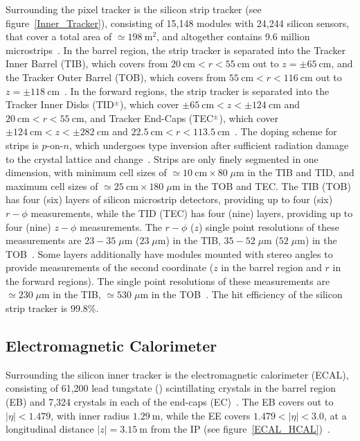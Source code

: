 Surrounding the pixel tracker is the silicon strip tracker (see figure~\ref{Inner_Tracker}), consisting of 15,148 modules with 24,244 silicon sensors, that cover a total area of $\simeq \SI{198}{\m \squared}$, and altogether contains 9.6 million microstrips~\cite{Chatrchyan:1129810}.
In the barrel region, the strip tracker is separated into the Tracker Inner Barrel (TIB), which covers from $\SI{20}{\cm} < r < \SI{55}{\cm}$ out to $z = \pm \SI{65}{\cm}$, and the Tracker Outer Barrel (TOB), which covers from $\SI{55}{\cm} < r < \SI{116}{\cm}$ out to $z = \pm \SI{118}{\cm}$~\cite{Bayatian:922757}.
In the forward regions, the strip tracker is separated into the Tracker Inner Disks (TID$^\pm$), which cover $\pm\SI{65}{\cm} < z < \pm\SI{124}{\cm}$ and $\SI{20}{\cm} < r < \SI{55}{\cm}$, and Tracker End-Caps (TEC$^\pm$), which cover $\pm\SI{124}{\cm} < z < \pm\SI{282}{\cm}$ and $\SI{22.5}{\cm} < r < \SI{113.5}{\cm}$~\cite{Bayatian:922757}.
The doping scheme for strips is $p$-on-$n$, which undergoes type inversion after sufficient radiation damage to the crystal lattice and change~\cite{Chatrchyan:1129810}.
Strips are only finely segmented in one dimension, with minimum cell sizes of  $\simeq \SI{10}{\cm} \times 80 \; \mu \si{\m}$ in the TIB and TID, and maximum cell sizes of $\simeq \SI{25}{\cm} \times 180 \; \mu \si{\m}$ in the TOB and TEC.
The TIB (TOB) has four (six) layers of silicon microstrip detectors, providing up to four (six) $r-\phi$ measurements, while the TID (TEC) has four (nine) layers, providing up to four (nine) $z-\phi$ measurements.
The $r-\phi$ ($z$) single point resolutions of these measurements are $23-35 \; \mu \si{\m}$ ($23 \; \mu \si{\m}$) in the TIB, $35-52 \; \mu \si{\m}$ ($52 \; \mu \si{\m}$) in the TOB~\cite{Bayatian:922757}.
Some layers additionally have modules mounted with stereo angles to provide measurements of the second coordinate ($z$ in the barrel region and $r$ in the forward regions).
The single point resolutions of these measurements are $\simeq 230 \; \mu \si{\m}$ in the TIB, $\simeq 530 \; \mu \si{\m}$ in the TOB~\cite{Chatrchyan:1129810}.
The hit efficiency of the silicon strip tracker is 99.8\%.

\subsection{Electromagnetic Calorimeter}
Surrounding the silicon inner tracker is the electromagnetic calorimeter (ECAL), consisting of 61,200 lead tungstate () scintillating crystals in the barrel region (EB) and 7,324 crystals in each of the end-caps (EC)~\cite{Bayatian:922757}.
The EB covers out to $\vert \eta \vert < 1.479$, with inner radius $\SI{1.29}{\m}$, while the EE covers $1.479 < \vert \eta \vert < 3.0$, at a longitudinal distance $\vert z \vert = \SI{3.15}{\m}$ from the IP (see figure~\ref{ECAL_HCAL})~\cite{Bayatian:922757}.

